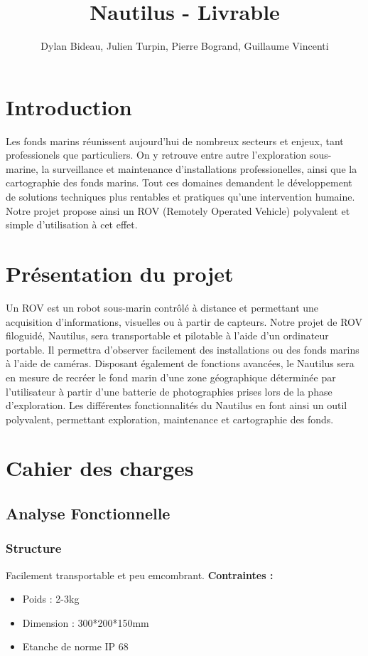 \documentclass[a4paper,11pt]{report}
\author{Dylan Bideau, Julien Turpin, Pierre Bogrand, Guillaume Vincenti}
\title{Nautilus - Livrable}
\begin{document}
\maketitle

\renewcommand{\contentsname}{Sommaire}
\tableofcontents


\chapter{Introduction}

        Les fonds marins réunissent aujourd'hui de nombreux secteurs et enjeux, tant professionels que particuliers. On y retrouve entre autre l'exploration sous-marine, la surveillance et maintenance d'installations professionelles, ainsi que la cartographie des fonds marins. Tout ces domaines demandent le développement de solutions techniques plus rentables et pratiques qu'une intervention humaine. Notre projet propose ainsi un ROV (Remotely Operated Vehicle) polyvalent et simple d'utilisation à cet effet.

\chapter{Présentation du projet}
        
				Un ROV est un robot sous-marin contrôlé à distance et permettant une acquisition d'informations, visuelles ou à partir de capteurs. Notre projet de ROV filoguidé, Nautilus, sera transportable et pilotable à l'aide d'un ordinateur portable. Il permettra d'observer facilement des installations ou des fonds marins à l'aide de caméras. Disposant également de fonctions avancées, le Nautilus sera en mesure de recréer le fond marin d'une zone géographique déterminée par l'utilisateur à partir d'une batterie de photographies prises lors de la phase d'exploration. Les différentes fonctionnalités du Nautilus en font ainsi un outil polyvalent, permettant exploration, maintenance et cartographie des fonds.
				
				
\chapter{Cahier des charges}

        \section{Analyse Fonctionnelle}
						\subsection{Structure}
								Facilement transportable et peu emcombrant.\newline
								\textbf{Contraintes :}
								\begin{itemize}
										\item Poids : 2-3kg
										\item Dimension : 300*200*150mm
										\item Etanche de norme IP 68 \newline \newline
									\end{itemize}
\end{document}
